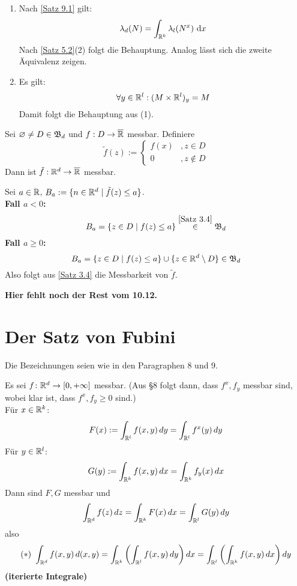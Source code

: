 \documentclass[a4paper,twoside,DIV15,BCOR12mm,chapterprefix=true,headings=onelinechapter]{scrbook}
\begin{document}
\begin{beweis}
\begin{enumerate}
\item Nach \ref{Satz 9.1} gilt:
\[\lambda_d(N)=\int_{\mathbb{R}^k}\lambda_l(N^x)\text{ d}x\]
Nach \ref{Satz 5.2}(2) folgt die Behauptung. Analog lässt sich die zweite Äquivalenz zeigen.
\item Es gilt:
\[\forall y\in\mathbb{R}^l:(M\times\mathbb{R}^l)_y=M\]
Damit folgt die Behauptung aus (1).
\end{enumerate}
\end{beweis}

\begin{lemma}
\label{Lemma 9.3}
Sei $\varnothing\ne D\in\mathfrak{B}_d$ und $f:D\to\overline{\mathbb{R}}$ messbar. Definiere
\[\tilde f(z):=\begin{cases} f(x) &,z\in D\\ 0&,z\not\in D\end{cases}\]
Dann ist $\tilde f:\mathbb{R}^d\to\overline{\mathbb{R}}$ messbar.
\end{lemma}

\begin{beweis}
Sei $a\in\mathbb{R}$, $B_a:=\{n\in\mathbb{R}^d\mid \tilde f(z)\le a\}$.\\
\textbf{Fall $a<0$:}
\[B_a=\{z\in D\mid f(z)\le a\}\stackrel{\ref{Satz 3.4}}\in\mathfrak{B}_d\]
\textbf{Fall $a\ge0$:}
\[B_a=\{z\in D\mid f(z)\le a\}\cup \{z\in\mathbb{R}^d\setminus D\}\in\mathfrak{B}_d\]
Also folgt aus \ref{Satz 3.4} die Messbarkeit von $\tilde f$.
\end{beweis}

\textbf{Hier fehlt noch der Rest vom 10.12.}

\chapter{Der Satz von Fubini}
Die Bezeichnungen seien wie in den Paragraphen 8 und 9.

\begin{satz}
\label{Satz 10.1}
Es sei \(f\colon\mathbb{R}^d\to[0,+\infty]\) messbar. (Aus \S 8 folgt dann, dass \(f^x,f_y\) messbar sind, wobei klar ist, dass \(f^x,f_y\geq 0\) sind.)\\
Für \(x\in\mathbb{R}^k\):
\[F(x):=\int_{\mathbb{R}^l}f(x,y)\,dy=\int_{\mathbb{R}^l}f^x(y)\,dy\]
Für \(y\in\mathbb{R}^l\):
\[G(y):=\int_{\mathbb{R}^k}f(x,y)\,dx=\int_{\mathbb{R}^k}f_y(x)\,dx\]
Dann sind $F,G$ messbar und 
\[\int_{\mathbb{R}^d}f(z)\,dz=\int_{\mathbb{R}^k}F(x)\,dx=\int_{\mathbb{R}^l}G(y)\,dy\]
also
\[ (\ast) \ \int_{\mdr^d}f(x,y)\,d(x,y)=\int_{\mdr^k}\left(\int_{\mdr^l}f(x,y)\,dy\right)dx=\int_{\mdr^l}\left(\int_{\mdr^k}f(x,y)\,dx\right)dy\]
\textbf{(iterierte Integrale)}
\end{satz}
\end{document}
